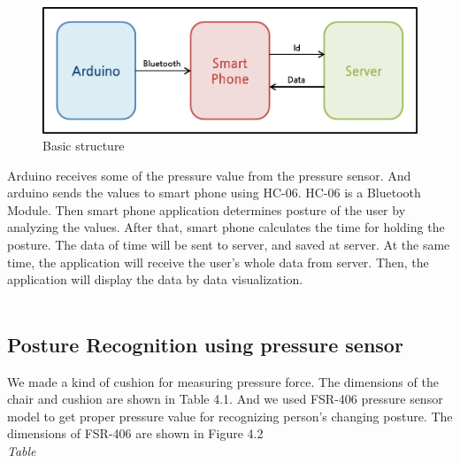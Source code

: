 \documentclass[conference]{IEEEtran}
\begin{document}
\begin{figure}[htbp]
\begin{center}
    \includegraphics[scale=0.55]{img_04.png}
    \caption{Basic structure} 
\end{center}
\end{figure}


 Arduino receives some of the pressure value from the pressure sensor. And arduino sends the values to smart phone using HC-06. HC-06 is a Bluetooth Module. Then smart phone application determines posture of the user by analyzing the values. After that, smart phone calculates the time for holding the posture. The data of time will be sent to server, and saved at server.
At the same time, the application will receive the user's whole data from server. Then, the application will display the data by data visualization.\\\\

\subsection{Posture Recognition using pressure sensor}
 We made a kind of cushion for measuring pressure force. The dimensions of the chair and cushion are shown in Table 4.1. And we used FSR-406 pressure sensor model to get proper pressure value for recognizing person's changing posture. The dimensions of FSR-406 are shown in Figure 4.2\\
 
\emph{Table}
\end{document}
